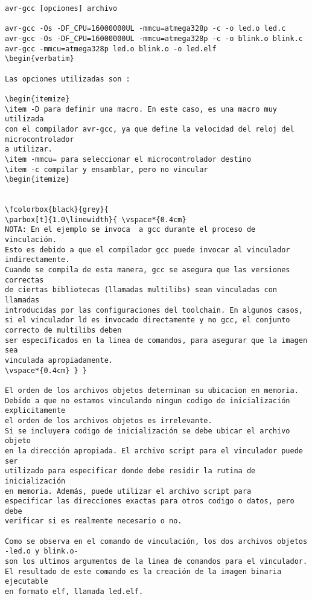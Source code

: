 \documentclass[12pt]{article}
\begin{document}
\begin{verbatim}
avr-gcc [opciones] archivo

avr-gcc -Os -DF_CPU=16000000UL -mmcu=atmega328p -c -o led.o led.c
avr-gcc -Os -DF_CPU=16000000UL -mmcu=atmega328p -c -o blink.o blink.c
avr-gcc -mmcu=atmega328p led.o blink.o -o led.elf
\begin{verbatim}

Las opciones utilizadas son :

\begin{itemize}
\item -D para definir una macro. En este caso, es una macro muy utilizada
con el compilador avr-gcc, ya que define la velocidad del reloj del microcontrolador
a utilizar.
\item -mmcu= para seleccionar el microcontrolador destino 
\item -c compilar y ensamblar, pero no vincular
\begin{itemize}


\fcolorbox{black}{grey}{
\parbox[t]{1.0\linewidth}{ \vspace*{0.4cm}
NOTA: En el ejemplo se invoca  a gcc durante el proceso de vinculación.
Esto es debido a que el compilador gcc puede invocar al vinculador indirectamente.
Cuando se compila de esta manera, gcc se asegura que las versiones correctas
de ciertas bibliotecas (llamadas multilibs) sean vinculadas con llamadas
introducidas por las configuraciones del toolchain. En algunos casos, si el vinculador ld es invocado directamente y no gcc, el conjunto correcto de multilibs deben
ser especificados en la linea de comandos, para asegurar que la imagen sea
vinculada apropiadamente.
\vspace*{0.4cm} } }

El orden de los archivos objetos determinan su ubicacion en memoria.
Debido a que no estamos vinculando ningun codigo de inicialización explicitamente
el orden de los archivos objetos es irrelevante.
Si se incluyera codigo de inicialización se debe ubicar el archivo objeto 
en la dirección apropiada. El archivo script para el vinculador puede ser 
utilizado para especificar donde debe residir la rutina de inicialización
en memoria. Además, puede utilizar el archivo script para 
especificar las direcciones exactas para otros codigo o datos, pero debe
verificar si es realmente necesario o no.

Como se observa en el comando de vinculación, los dos archivos objetos -led.o y blink.o-
son los ultimos argumentos de la linea de comandos para el vinculador.
El resultado de este comando es la creación de la imagen binaria ejecutable
en formato elf, llamada led.elf.


\end{verbatim}
\end{document}
